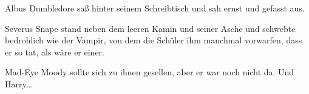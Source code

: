 Albus Dumbledore saß hinter seinem Schreibtisch und sah ernst und gefasst aus.

Severus Snape stand neben dem leeren Kamin und seiner Asche und schwebte bedrohlich wie der Vampir, von dem die Schüler ihm manchmal vorwarfen, dass er so tat, als wäre er einer.


Mad-Eye Moody sollte sich zu ihnen gesellen, aber er war noch nicht da.
Und Harry…



